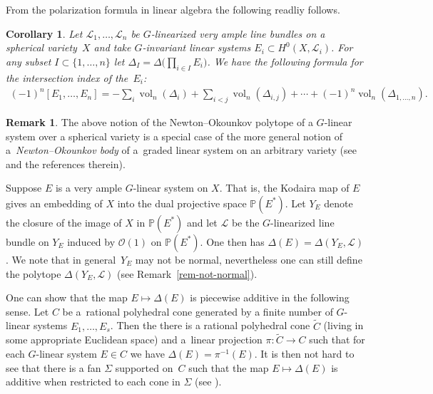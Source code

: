 \documentclass[10pt,a4paper]{amsart}
\def \p{\mathbb{P}}
\def \vol{\operatorname{vol}}
\numberwithin{equation}{section}
\newtheorem{Cor}[Th]{Corollary}
\theoremstyle{definition}
\newtheorem{Rem}[Th]{Remark}
\begin{document}
From the polarization formula in linear algebra the following readliy follows.
\begin{Cor} \label{prop-int-number-several-divisors}
Let ${\mathcal L}_1, \ldots, {\mathcal L}_n$ be $G$-linearized very ample line bundles on a spherical variety~$X$ and take $G$-invariant linear systems $E_i \subset H^0(X, {\mathcal L}_i)$. For any subset $I \subset \{1, \ldots, n\}$ let $\Delta_I = \Delta\big(\prod_{i \in I} E_i\big)$. We have the following formula for the intersection index of the~$E_i$:
\begin{gather*}
(-1)^n [E_1, \ldots, E_n] = - \sum_{i} \vol_n(\Delta_i) + \sum_{i < j} \vol_n(\Delta_{i,j}) + \cdots
+ (-1)^n \vol_n(\Delta_{1, \ldots, n}).
\end{gather*}
\end{Cor}

\begin{Rem} \label{rem-NO-body}The above notion of the Newton--Okounkov polytope of a $G$-linear system over a spherical variety is a special case of the more general notion of a~{\it Newton--Okounkov body} of a~graded linear system on an arbitrary variety (see \cite{KKh-Annals, LM} and the references therein).
\end{Rem}

Suppose $E$ is a very ample $G$-linear system on $X$. That is, the Kodaira map of $E$ gives an embedding of $X$ into the dual projective space $\p(E^*)$. Let $Y_E$ denote the closure of the image of $X$ in $\p(E^*)$ and let ${\mathcal L}$ be the $G$-linearized line bundle on $Y_E$ induced by $\mathcal{O}(1)$ on $\p(E^*)$. One then has $\Delta(E) = \Delta(Y_E, {\mathcal L})$. We note that in general~$Y_E$ may not be normal, nevertheless one can still define the polytope $\Delta(Y_E, {\mathcal L})$ (see Remark~\ref{rem-not-normal}).

One can show that the map $E \mapsto \Delta(E)$ is piecewise additive in the following sense. Let $C$ be a~rational polyhedral cone generated by a finite number of $G$-linear systems $E_1, \ldots, E_s$. Then the there is a rational polyhedral cone $\tilde{C}$ (living in some appropriate Euclidean space) and a~linear projection $\pi\colon \tilde{C} \to C$ such that for each $G$-linear system $E \in C$ we have $\Delta(E) = \pi^{-1}(E)$. It is then not hard to see that there is a fan $\Sigma$ supported on~$C$ such that the map
$E \mapsto \Delta(E)$ is additive when restricted to each cone in $\Sigma$ (see \cite[Proposition~1.4]{KV}).
\end{document}
